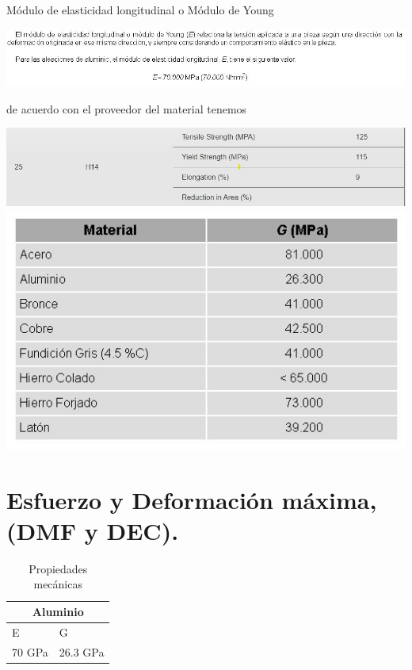 \bigskip
\bigskip
\bigskip
\bigskip
\textrm{Módulo de elasticidad longitudinal o Módulo de Young}

\begin{center}
\includegraphics[width=0.9\linewidth]{D/figs/D_3.jpg} 
\end{center}


\textrm{de acuerdo con el proveedor del material tenemos}
\begin{center}
\includegraphics[width=0.9\linewidth]{D/figs/D_4.jpeg} 
\includegraphics[width=0.9\linewidth]{D/figs/D_5.jpg} 
\end{center}

\section{Esfuerzo y Deformación máxima, (DMF y DEC).}

\begin{table}[htb]
\centering
\begin{tabular}{| p{2.2cm}| p{2.2cm} |}
\hline
\multicolumn{2}{|c|}{Aluminio} \\
\hline
E & G \\
\hline \hline
70 GPa & 26.3 GPa  \\ \hline
\end{tabular}
\caption{Propiedades mecánicas}
\label{}
\end{table}


